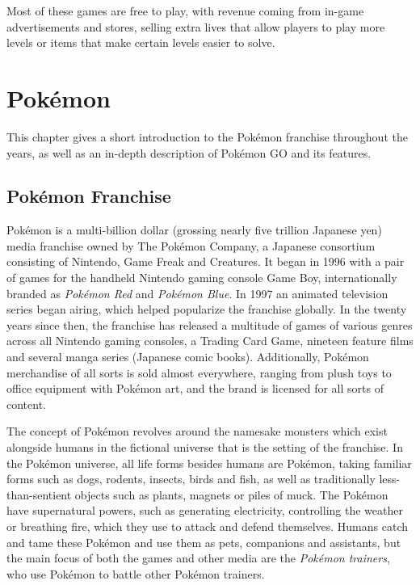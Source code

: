 Most of these games are free to play, with revenue coming from in-game advertisements and stores, selling extra lives that allow players to play more levels or items that make certain levels easier to solve.


\chapter{Pokémon}
\label{chapter:lit-study-pokemon-go}

This chapter gives a short introduction to the Pokémon franchise throughout the years, as well as an in-depth description of Pokémon GO and its features.

\section{Pokémon Franchise}

Pokémon is a multi-billion dollar (grossing nearly five trillion Japanese yen) media franchise owned by The Pokémon Company, a Japanese consortium consisting of Nintendo, Game Freak and Creatures. It began in 1996 with a pair of games for the handheld Nintendo gaming console Game Boy, internationally branded as \emph{Pokémon Red} and \emph{Pokémon Blue}. In 1997 an animated television series began airing, which helped popularize the franchise globally. In the twenty years since then, the franchise has released a multitude of games of various genres across all Nintendo gaming consoles, a Trading Card Game, nineteen feature films and several manga series (Japanese comic books). Additionally, Pokémon merchandise of all sorts is sold almost everywhere, ranging from plush toys to office equipment with Pokémon art, and the brand is licensed for all sorts of content.

The concept of Pokémon revolves around the namesake monsters which exist alongside humans in the fictional universe that is the setting of the franchise. In the Pokémon universe, all life forms besides humans are Pokémon, taking familiar forms such as dogs, rodents, insects, birds and fish, as well as traditionally less-than-sentient objects such as plants, magnets or piles of muck. The Pokémon have supernatural powers, such as generating electricity, controlling the weather or breathing fire, which they use to attack and defend themselves. Humans catch and tame these Pokémon and use them as pets, companions and assistants, but the main focus of both the games and other media are the \emph{Pokémon trainers}, who use Pokémon to battle other Pokémon trainers.

